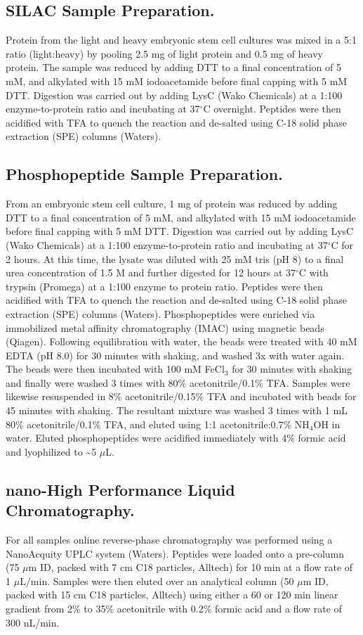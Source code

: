 \subsection{SILAC Sample Preparation.}
Protein from the light and heavy embryonic stem cell cultures was mixed in a 5:1 ratio (light:heavy) by pooling 2.5 mg of light protein and 0.5 mg of heavy protein. The sample was reduced by adding DTT to a final concentration of 5 mM, and alkylated with 15 mM iodoacetamide before final capping with 5 mM DTT. Digestion was carried out by adding LysC (Wako Chemicals) at a 1:100 enzyme-to-protein ratio and incubating at 37$^\circ$C overnight. Peptides were then acidified with TFA to quench the reaction and de-salted using C-18 solid phase extraction (SPE) columns (Waters).

\subsection{Phosphopeptide Sample Preparation.}
From an embryonic stem cell culture, 1 mg of protein was reduced by adding DTT to a final concentration of 5 mM, and alkylated with 15 mM iodoacetamide before final capping with 5 mM DTT. Digestion was carried out by adding LysC (Wako Chemicals) at a 1:100 enzyme-to-protein ratio and incubating at 37$^\circ$C for 2 hours. At this time, the lysate was diluted with 25 mM tris (pH 8) to a final urea concentration of 1.5 M and further digested for 12 hours at 37$^\circ$C with trypsin (Promega) at a 1:100 enzyme to protein ratio. Peptides were then acidified with TFA to quench the reaction and de-salted using C-18 solid phase extraction (SPE) columns (Waters).
Phosphopeptides were enriched via immobilized metal affinity chromatography (IMAC) using magnetic beads (Qiagen). Following equilibration with water, the beads were treated with 40 mM EDTA (pH 8.0) for 30 minutes with shaking, and washed 3x with water again. The beads were then incubated with 100 mM FeCl$_3$ for 30 minutes with shaking and finally were washed 3 times with 80\% acetonitrile/0.1\% TFA. Samples were likewise resuspended in 8\% acetonitrile/0.15\% TFA and incubated with beads for 45 minutes with shaking. The resultant mixture was washed 3 times with 1 mL 80\% acetonitrile/0.1\% TFA, and eluted using 1:1 acetonitrile:0.7\% NH$_4$OH in water. Eluted phosphopeptides were acidified immediately with 4\% formic acid and lyophilized to \textasciitilde5 $\mu$L.

\subsection{nano-High Performance Liquid Chromatography.}
For all samples online reverse-phase chromatography was performed using a NanoAcquity UPLC system (Waters). Peptides were loaded onto a pre-column (75 $\mu$m ID, packed with 7 cm C18 particles, Alltech) for 10 min at a flow rate of 1 $\mu$L/min. Samples were then eluted over an analytical column (50 $\mu$m ID, packed with 15 cm C18 particles, Alltech) using either a 60 or 120 min linear gradient from 2\% to 35\% acetonitrile with 0.2\% formic acid and a flow rate of 300 nL/min.

